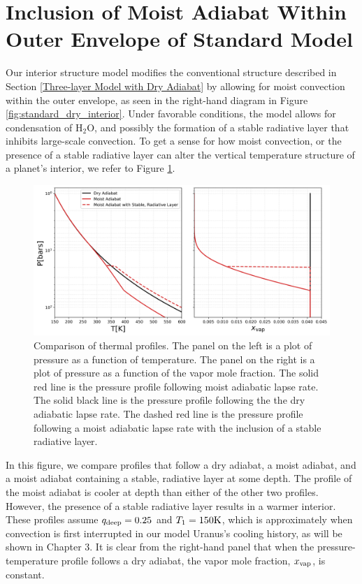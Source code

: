 \documentclass[11pt]{ucscthesisbs}
\begin{document}
\section{Inclusion of Moist Adiabat Within Outer Envelope of Standard Model}
Our interior structure model modifies the conventional structure described in Section \ref{Three-layer Model with Dry Adiabat} by allowing for moist convection within the outer envelope, as seen in the right-hand diagram in Figure \ref{fig:standard_dry_interior}. Under favorable conditions, the model allows for condensation of H$_{2}$O, and possibly the formation of a stable radiative layer that inhibits large-scale convection. To get a sense for how moist convection, or the presence of a stable radiative layer can alter the vertical temperature structure of a planet's interior, we refer to Figure \ref{fig:comparison_adiabatic_profiles}. 
\begin{figure}[h]
 \centerline{
  \includegraphics[width=\columnwidth]{figures/comparison_dry_vs_moist_lapse_rates.png}
 }
\caption[A Standard Interior Structure Model]
{Comparison of thermal profiles. The panel on the left is a plot of pressure as a function of temperature. The panel on the right is a plot of pressure as a function of the vapor mole fraction. The solid red line is the pressure profile following moist adiabatic lapse rate. The solid black line is the pressure profile following the the dry adiabatic lapse rate. The dashed red line is the pressure profile following a moist adiabatic lapse rate with the inclusion of a stable radiative layer.} 
\label{fig:comparison_adiabatic_profiles}
\end{figure}
In this figure, we compare profiles that follow a dry adiabat, a moist adiabat, and a moist adiabat containing a stable, radiative layer at some depth. The profile of the moist adiabat is cooler at depth than either of the other two profiles. However, the presence of a stable radiative layer results in a warmer interior. These profiles assume $q_{\rm deep} = 0.25$ and $T_{1} = 150\rm K$, which is approximately when convection is first interrupted in our model Uranus's cooling history, as will be shown in Chapter 3. It is clear from the right-hand panel that when the pressure-temperature profile follows a dry adiabat, the vapor mole fraction, $x_{\rm vap}$, is constant.
\end{document}
